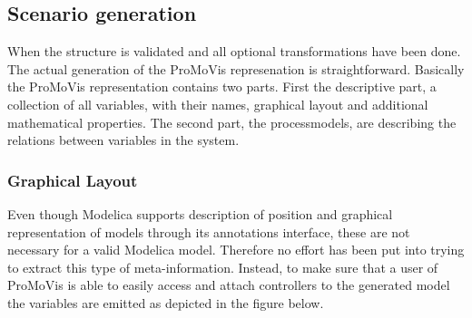 \subsection{Scenario generation}
When the structure is validated and all optional transformations have been done. The actual generation of the ProMoVis represenation is straightforward. Basically the ProMoVis representation contains two parts. First the descriptive part, a collection of all variables, with their names, graphical layout and additional mathematical properties. The second part, the processmodels, are describing the relations between variables in the system. 
\subsubsection{Graphical Layout}
Even though Modelica supports description of position and graphical representation of models through its annotations interface, these are not necessary for a valid Modelica model. Therefore no effort has been put into trying to extract this type of meta-information. Instead, to make sure that a user of ProMoVis is able to easily access and attach controllers to the generated model the variables are emitted as depicted in the figure below.\\\newline
\setlength\fboxsep{0pt}
\setlength\fboxrule{0.5pt}
